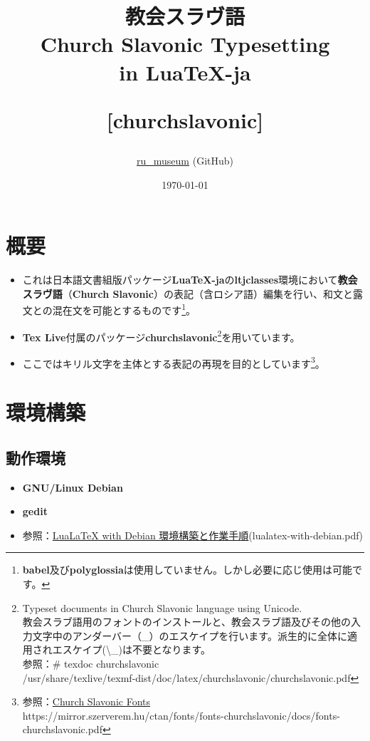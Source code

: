 \documentclass[a4paper,12pt]{ltjsarticle}
\title{
    \huge {\Huge\fNotoSerif 教会スラヴ語}\\Church Slavonic Typesetting\\ in LuaTeX-ja\par\vspace{8mm}
    \Large{ [churchslavonic] } \par\vspace{120mm}
  }
\author{\href{https://github.com/ru-museum/}{ru\_museum} (GitHub)}
\date{\today}
\def\colH#1{\color[HTML]{#1}}
\def\bs{\textbackslash}
\def\bf{\textbf}
\begin{document}
\maketitle

 \thispagestyle{empty}

  \clearpage
  \addtocounter{page}{-2}

  \newpage

  \tableofcontents
  \thispagestyle{empty}

  \newpage

\section{概要}
\begin{itemize}
  \item これは日本語文書組版パッケージ\bf{Lua\TeX{}-ja}の\bf{ltjclasses}環境において\bf{教会スラヴ語}（\bf{Church Slavonic}）の表記（含ロシア語）編集を行い、和文と露文との混在文を可能とするものです\footnote{\bf{babel}及び\bf{polyglossia}は使用していません。しかし必要に応じ使用は可能です。}。
  \item \textbf{Tex Live}付属のパッケージ\bf{churchslavonic}\footnote{Typeset documents in Church Slavonic language using Unicode.\\教会スラブ語用のフォントのインストールと、教会スラブ語及びその他の入力文字中のアンダーバー（_）のエスケイプを行います。派生的に全体に適用されエスケイプ({\colH{800000}\bs _})は不要となります。\\参照：\# texdoc churchslavonic\\\qquad\quad/usr/share/texlive/texmf-dist/doc/latex/churchslavonic/churchslavonic.pdf}を用いています。
  \item ここではキリル文字を主体とする表記の再現を目的としています\footnote{参照：\href{https://mirror.szerverem.hu/ctan/fonts/fonts-churchslavonic/docs/fonts-churchslavonic.pdf}{Church Slavonic Fonts}\\
https://mirror.szerverem.hu/ctan/fonts/fonts-churchslavonic/docs/fonts-churchslavonic.pdf}。
\end{itemize}
\vspace{-6mm}

\section{環境構築}

\subsection{動作環境}
\vspace{-2mm}
\begin{itemize}
  \item[] \textbf{GNU/Linux Debian}
  \item[] \textbf{gedit}  
  \item[] 参照：\href{https://github.com/ru-museum/lib-russian-luatexja/blob/main/lualatex-with-\qquad debian.pdf}{LuaLa\TeX{} with Debian 環境構築と作業手順}(lualatex-with-debian.pdf) 
\end{itemize}
\vspace{-8mm}
\end{document}
